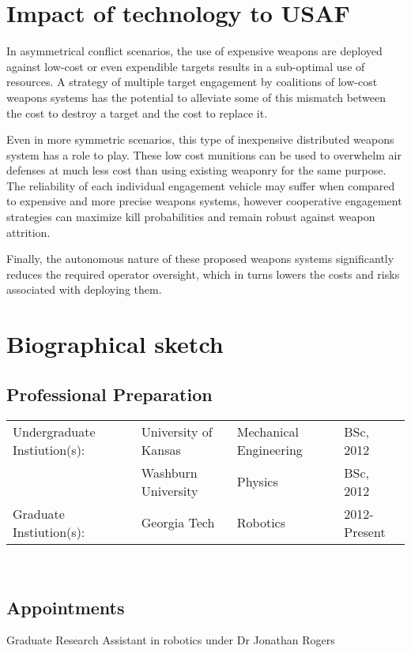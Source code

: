 \documentclass{article}
\begin{document}
\section{Impact of technology to USAF}
In asymmetrical conflict scenarios, the use of expensive weapons are deployed against low-cost or even expendible targets results in a sub-optimal use of resources. A strategy of multiple target engagement by coalitions of low-cost weapons systems has the potential to alleviate some of this mismatch between the cost to destroy a target and the cost to replace it.

Even in more symmetric scenarios, this type of inexpensive distributed weapons system has a role to play. These low cost munitions can be used to overwhelm air defenses at much less cost than using existing weaponry for the same purpose. The reliability of each individual engagement vehicle may suffer when compared to expensive and more precise weapons systems, however cooperative engagement strategies can maximize kill probabilities and remain robust against weapon attrition.

Finally, the autonomous nature of these proposed weapons systems significantly reduces the required operator oversight, which in turns lowers the costs and risks associated with deploying them.


\section{Biographical sketch}
\subsection{Professional Preparation}
\begin{tabular}{llll}
Undergraduate Instiution(s): &University of Kansas &Mechanical Engineering &BSc, 2012\\
&Washburn University &Physics &BSc, 2012\\
Graduate Instiution(s):&Georgia Tech &Robotics &2012-Present \\

\end{tabular}\\

\subsection{Appointments}
Graduate Research Assistant in robotics under Dr Jonathan Rogers\\
\end{document}
